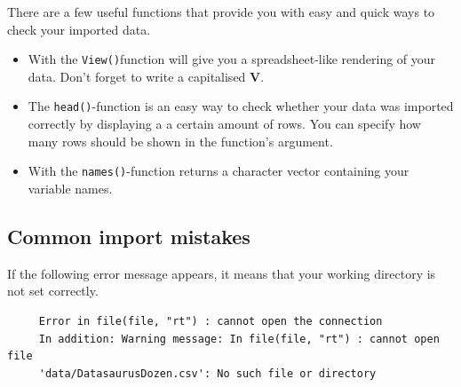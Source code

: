 \documentclass[
  letterpaper,
  DIV=11,
  numbers=noendperiod,
  oneside]{scrreprt}
\begin{document}
There are a few useful functions that provide you with easy and quick
ways to check your imported data.

\begin{itemize}
\item
  With the \texttt{View()}function will give you a spreadsheet-like
  rendering of your data. Don't forget to write a capitalised
  \textbf{V}.
\item
  The \texttt{head()}-function is an easy way to check whether your data
  was imported correctly by displaying a a certain amount of rows. You
  can specify how many rows should be shown in the function's argument.
\item
  With the \texttt{names()}-function returns a character vector
  containing your variable names.
\end{itemize}

\hypertarget{common-import-mistakes}{%
\subsection{Common import mistakes}\label{common-import-mistakes}}

\begin{tcolorbox}[enhanced jigsaw, arc=.35mm, left=2mm, breakable, toprule=.15mm, opacityback=0, colframe=quarto-callout-tip-color-frame, colback=white, rightrule=.15mm, bottomrule=.15mm, leftrule=.75mm]
\begin{minipage}[t]{5.5mm}
\textcolor{quarto-callout-tip-color}{\faLightbulb}
\end{minipage}%
\begin{minipage}[t]{\textwidth - 5.5mm}

If the following error message appears, it means that your working
directory is not set correctly.

\begin{verbatim}
     Error in file(file, "rt") : cannot open the connection         
     In addition: Warning message: In file(file, "rt") : cannot open file                            
     'data/DatasaurusDozen.csv': No such file or directory
\end{verbatim}

\end{minipage}%
\end{tcolorbox}
\end{document}
